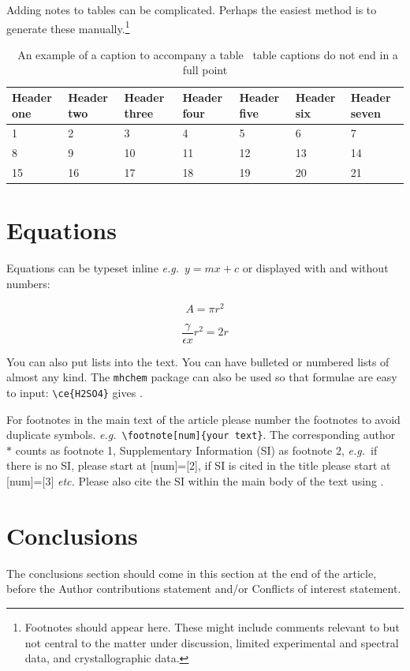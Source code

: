 \documentclass[twoside,twocolumn,9pt]{article}
\begin{document}
Adding notes to tables can be complicated.  Perhaps the easiest method is to generate these manually.\footnote[4]{Footnotes should appear here. These might include comments relevant to but not central to the matter under discussion, limited experimental and spectral data, and crystallographic data.}

\begin{table}
\small
  \caption{\ An example of a caption to accompany a table \textendash\ table captions do not end in a full point}
  \label{tbl:example2}
  \begin{tabular*}{\textwidth}{@{\extracolsep{\fill}}lllllll}
    \hline
    Header one & Header two & Header three & Header four & Header five & Header six  & Header seven\\
    \hline
    1 & 2 & 3 & 4 & 5 & 6  & 7\\
    8 & 9 & 10 & 11 & 12 & 13 & 14 \\
    15 & 16 & 17 & 18 & 19 & 20 & 21\\
    \hline
  \end{tabular*}
\end{table}

\section{Equations}

Equations can be typeset inline \textit{e.g.}\ $ y = mx + c$ or displayed with and without numbers:

 \[ A = \pi r^2 \]

\begin{equation}
  \frac{\gamma}{\epsilon x} r^2 = 2r
\end{equation}

You can also put lists into the text. You can have bulleted or numbered lists of almost any kind. 
The \texttt{mhchem} package can also be used so that formulae are easy to input: \texttt{\textbackslash ce\{H2SO4\}} gives . 

For footnotes in the main text of the article please number the footnotes to avoid duplicate symbols. \textit{e.g.}\ \texttt{\textbackslash footnote[num]\{your text\}}. The corresponding author $\ast$ counts as footnote 1, Supplementary Information (SI) as footnote 2, \textit{e.g.}\ if there is no SI, please start at [num]=[2], if SI is cited in the title please start at [num]=[3] \textit{etc.} Please also cite the SI within the main body of the text using \dag.

\section*{Conclusions}
The conclusions section should come in this section at the end of the article, before the Author contributions statement and/or Conflicts of interest statement.
\end{document}
